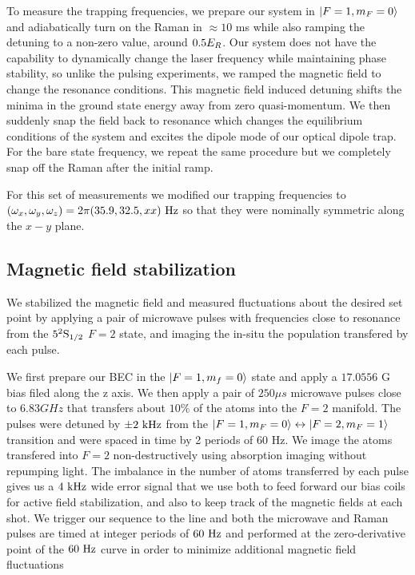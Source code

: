  To measure the trapping frequencies, we prepare our system in $|F=1,m_F=0\rangle$ and adiabatically turn on the Raman in $\approx10$ ms while also ramping the detuning to a non-zero value, around $0.5{{E_R}}$. Our system does not have the capability to dynamically change the laser frequency while maintaining phase stability, so unlike the pulsing experiments, we ramped the magnetic field to change the resonance conditions. This magnetic field induced detuning shifts the minima in the ground state energy away from zero quasi-momentum. We then suddenly snap the field back to resonance which changes the equilibrium conditions of the system and excites the dipole mode of our optical dipole trap. For the bare state frequency, we repeat the same procedure but we completely snap off the Raman after the initial ramp. 

For this set of measurements we modified our trapping frequencies to $(\omega_x, \omega_y, \omega_z)=2\pi(35.9, 32.5, xx) {\ {\rm Hz}}$  so that they were nominally symmetric along the $x-y$ plane. 

\subsection{Magnetic field stabilization}
We stabilized the magnetic field and measured fluctuations about the desired set point by applying a pair of microwave pulses with frequencies close to resonance from the $5^2{\rm S}_{1/2}$ $F=2$ state, and imaging the in-situ the population transfered by each pulse. 

We first prepare our BEC in the $|F=1, m_f=0\rangle$ state and apply a $17.0556$ G bias filed along the z axis. We then apply a pair of $250\mu s$ microwave pulses close to $6.83 GHz$ that transfers about $10\%$ of the atoms into the $F=2$ manifold. The pulses were detuned by $\pm 2{\ {\rm kHz}}$ from the $|F=1,m_F=0\rangle\leftrightarrow|F=2,m_F=1\rangle$ transition and were spaced in time by 2 periods of 60 Hz. We image the atoms transfered into $F=2$ non-destructively using absorption imaging without repumping light. The imbalance in the number of atoms transferred by each pulse gives us a $4{\ {\rm kHz}}$ wide error signal that we use both to feed forward our bias coils for active field stabilization, and also to keep track of the magnetic fields at each shot. We trigger our sequence to the line and both the microwave and Raman pulses are timed at integer periods of $60{\ {\rm Hz}}$ and performed at the zero-derivative point of the $60{\ {\rm Hz}}$ curve in order to minimize additional magnetic field fluctuations

